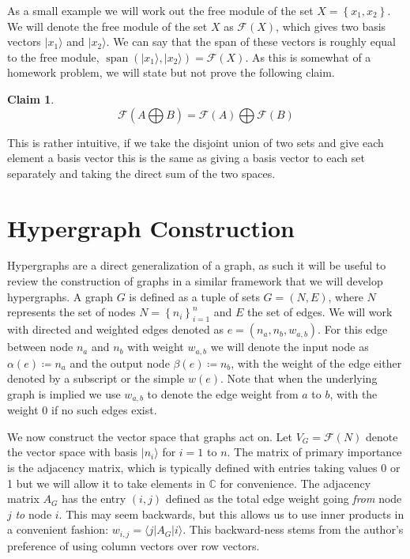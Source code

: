 \documentclass{article}
\newcommand{\ket}[1]{|#1\rangle}
\newcommand{\bra}[1]{\langle #1|}
\newcommand{\set}[1]{\left\{ #1 \right\}}
\newcommand{\field}{\mathbb{C}}
\DeclareMathOperator{\cspan}{span}
\newtheorem{claim}[theorem]{Claim}
\begin{document}
As a small example we will work out the free module of the set $X = \set{x_1, x_2}$. We will denote the free module of the set $X$ as $\mathcal{F}(X)$, which gives two basis vectors $\ket{x_1}$ and $\ket{x_2}$. We can say that the span of these vectors is roughly equal to the free module, $\cspan (\ket{x_1}, \ket{x_2}) = \mathcal{F}(X)$. As this is somewhat of a homework problem, we will state but not prove the following claim.
\begin{claim}
\begin{equation}
\mathcal{F}(A \bigoplus B) = \mathcal{F}(A) \bigoplus \mathcal{F}(B)    
\end{equation}
\end{claim}
This is rather intuitive, if we take the disjoint union of two sets and give each element a basis vector this is the same as giving a basis vector to each set separately and taking the direct sum of the two spaces.

\section{Hypergraph Construction} \label{sec:hyperspace}

Hypergraphs are a direct generalization of a graph, as such it will be useful to review the construction of graphs in a similar framework that we will develop hypergraphs. A graph $G$ is defined as a tuple of sets $G = (N, E)$, where $N$ represents the set of nodes $N = \set{n_i}_{i=1}^n$ and $E$ the set of edges. We will work with directed and weighted edges denoted as $e = (n_a, n_b, w_{a,b})$. For this edge between node $n_a$ and $n_b$ with weight $w_{a,b}$ we will denote the input node as $\alpha(e) \coloneqq n_a$ and the output node $\beta(e) \coloneqq n_b$, with the weight of the edge either denoted by a subscript or the simple $w(e)$. Note that when the underlying graph is implied we use $w_{a,b}$ to denote the edge weight from $a$ to $b$, with the weight 0 if no such edges exist.

We now construct the vector space that graphs act on. Let $V_G = \mathcal{F}(N)$ denote the vector space with basis $\ket{n_i}$ for $i = 1$ to $n$. The matrix of primary importance is the adjacency matrix, which is typically defined with entries taking values 0 or 1 but we will allow it to take elements in $\field$ for convenience. The adjacency matrix $A_G$ has the entry $(i,j)$ defined as the total edge weight going \emph{from} node $j$ \emph{to} node $i$. This may seem backwards, but this allows us to use inner products in a convenient fashion: $w_{i,j} = \bra{j} A_G \ket{i}$. This backward-ness stems from the author's preference of using column vectors over row vectors. 
\end{document}
